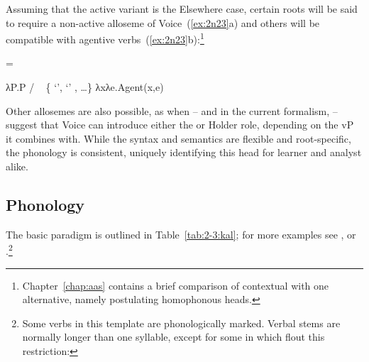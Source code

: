 \begin{exe}
\begin{xlist}
\begin{exe}
\begin{xlist}
\begin{exe}
\begin{xlist}
\begin{exe}
\begin{exe}
\begin{xlist}
\begin{exe}
\begin{xlist}
\begin{exe}
\begin{xlist}
\begin{exe}
\begin{xlist}
\begin{exe}
\begin{xlist}
\begin{exe}
\begin{xlist}
\begin{exe}
\begin{xlist}
\begin{exe}
\begin{xlist}
\begin{exe}
\begin{xlist}
\begin{exe}
\begin{xlist}
\begin{exe}
\begin{xlist}
\begin{exe}
\begin{xlist}
\begin{exe}
\begin{xlist}
\begin{exe}
\begin{exe}
\begin{xlist}
\begin{exe}
\begin{xlist}
\begin{exe}
\begin{xlist}
\begin{exe}
\begin{xlist}
Assuming that the active variant is the Elsewhere case, certain roots will be said to require a non-active alloseme of Voice~(\ref{ex:2n23}a) and others will be compatible with agentive verbs~(\ref{ex:2n23}b):\footnote{Chapter~\ref{chap:aas} contains a brief comparison of contextual  with one alternative, namely postulating homophonous heads.}
 \begin{exe}
 \ex  \label{ex:2n23} =  
 \begin{xlist} 
 	\ex  λP.P \phantom{agent(x,e)xxx} / \trace~ \{  `',  `' , \dots \} 
 	\ex  λxλe.Agent(x,e) 
 \z
\z 

Other allosemes are also possible, as when \cite{kratzer96} -- and in the current formalism, \cite{woodmarantz17} -- suggest that Voice can introduce either the  or Holder role, depending on the vP it combines with. While the syntax and semantics are flexible and root-specific, the phonology is consistent, uniquely identifying this head for learner and analyst alike.
		
		\subsection{Phonology} \label{voice:voice:phono}
The basic paradigm is outlined in Table~\ref{tab:2-3:kal}; for more examples see \cite{schwarzwald08}, \cite{faust12} or \cite{kastner18nllt}.\footnote{Some verbs in this template are phonologically marked. Verbal stems are normally longer than one syllable, except for some in {\tkal} which flout this restriction:

}
\end{xlist}
\end{exe}
\end{xlist}
\end{exe}
\end{xlist}
\end{exe}
\end{xlist}
\end{exe}
\end{xlist}
\end{exe}
\end{exe}
\end{xlist}
\end{exe}
\end{xlist}
\end{exe}
\end{xlist}
\end{exe}
\end{xlist}
\end{exe}
\end{xlist}
\end{exe}
\end{xlist}
\end{exe}
\end{xlist}
\end{exe}
\end{xlist}
\end{exe}
\end{xlist}
\end{exe}
\end{xlist}
\end{exe}
\end{xlist}
\end{exe}
\end{xlist}
\end{exe}
\end{xlist}
\end{exe}
\end{exe}
\end{xlist}
\end{exe}
\end{xlist}
\end{exe}
\end{xlist}
\end{exe}
